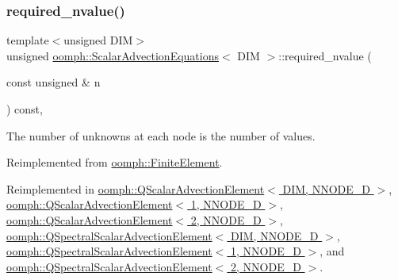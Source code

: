\mbox{\label{classoomph_1_1ScalarAdvectionEquations_a71a3c28feb1156376cbf55e7043e27e8}} 
\subsubsection{\texorpdfstring{required\+\_\+nvalue()}{required\_nvalue()}}
{\footnotesize\ttfamily template$<$unsigned D\+IM$>$ \\
unsigned \hyperlink{classoomph_1_1ScalarAdvectionEquations}{oomph\+::\+Scalar\+Advection\+Equations}$<$ D\+IM $>$\+::required\+\_\+nvalue (\begin{DoxyParamCaption}\item[{const unsigned \&}]{n }\end{DoxyParamCaption}) const\hspace{0.3cm}{\ttfamily [inline]}, {\ttfamily [virtual]}}



The number of unknowns at each node is the number of values. 



Reimplemented from \hyperlink{classoomph_1_1FiniteElement_a56610c60d5bc2d7c27407a1455471b1a}{oomph\+::\+Finite\+Element}.



Reimplemented in \hyperlink{classoomph_1_1QScalarAdvectionElement_a967897f5171c0b1e03a1f85d40025959}{oomph\+::\+Q\+Scalar\+Advection\+Element$<$ D\+I\+M, N\+N\+O\+D\+E\+\_\+D $>$}, \hyperlink{classoomph_1_1QScalarAdvectionElement_a967897f5171c0b1e03a1f85d40025959}{oomph\+::\+Q\+Scalar\+Advection\+Element$<$ 1, N\+N\+O\+D\+E\+\_\+D $>$}, \hyperlink{classoomph_1_1QScalarAdvectionElement_a967897f5171c0b1e03a1f85d40025959}{oomph\+::\+Q\+Scalar\+Advection\+Element$<$ 2, N\+N\+O\+D\+E\+\_\+D $>$}, \hyperlink{classoomph_1_1QSpectralScalarAdvectionElement_a7467b1b382307bb0d40901519465b4b1}{oomph\+::\+Q\+Spectral\+Scalar\+Advection\+Element$<$ D\+I\+M, N\+N\+O\+D\+E\+\_\+D $>$}, \hyperlink{classoomph_1_1QSpectralScalarAdvectionElement_a7467b1b382307bb0d40901519465b4b1}{oomph\+::\+Q\+Spectral\+Scalar\+Advection\+Element$<$ 1, N\+N\+O\+D\+E\+\_\+D $>$}, and \hyperlink{classoomph_1_1QSpectralScalarAdvectionElement_a7467b1b382307bb0d40901519465b4b1}{oomph\+::\+Q\+Spectral\+Scalar\+Advection\+Element$<$ 2, N\+N\+O\+D\+E\+\_\+D $>$}.




